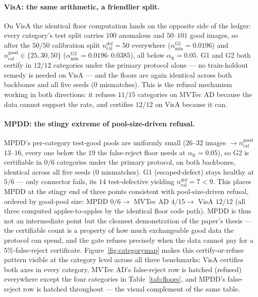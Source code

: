 \documentclass[preprint,11pt]{elsarticle}
\begin{document}
\paragraph{VisA: the same arithmetic, a friendlier split.} On VisA the identical floor
computation lands on the opposite side of the ledger: every category's test split carries
$100$ anomalous and $50$--$101$ good images, so after the $50/50$ calibration split
$n_{\text{cal}}^{\text{def}} = 50$ everywhere ($\alpha_{\min}^{\text{G1}} = 0.0196$) and
$n_{\text{cal}}^{\text{good}} \in \{25, 30, 50\}$ ($\alpha_{\min}^{\text{G2}} =
0.0196$--$0.0385$), all below $\alpha_{\text{fr}} = 0.05$. G1 and G2 both certify in
$12/12$ categories under the primary protocol alone --- no train-holdout remedy is needed on
VisA --- and the floors are again identical across both backbones and all five seeds ($0$
mismatches). This is the refusal mechanism working in both directions: it refuses $11/15$
categories on MVTec AD because the data cannot support the rate, and certifies $12/12$ on VisA
because it can.

\paragraph{MPDD: the stingy extreme of pool-size-driven refusal.} MPDD's per-category
test-good pools are uniformly small ($26$--$32$ images $\to n_{\text{cal}}^{\text{good}}$
$13$--$16$, every one below the $19$ the false-reject floor needs at $\alpha_{\text{fr}}=0.05$),
so G2 is certifiable in $0/6$ categories under the primary protocol, on both backbones,
identical across all five seeds ($0$ mismatches). G1 (escaped-defect) stays healthy at $5/6$ ---
only connector fails, its $14$ test-defective yielding $n_{\text{cal}}^{\text{def}}=7<9$.
This places MPDD at the stingy end of three points consistent with pool-size-driven refusal, ordered by good-pool size:
MPDD $0/6 \to$ MVTec AD $4/15 \to$ VisA $12/12$ (all three computed apples-to-apples by
the identical floor code path). MPDD is thus not an intermediate point but the cleanest
demonstration of the paper's thesis --- the certifiable count is a property of how much
exchangeable good data the protocol can spend, and the gate refuses precisely when the data
cannot pay for a $5\%$-false-reject certificate.
Figure~\ref{fig:categorymap} makes this certify-or-refuse pattern visible at the category level
across all three benchmarks: VisA certifies both axes in every category, MVTec AD's false-reject
row is hatched (refused) everywhere except the four categories in Table~\ref{tab:floors}, and
MPDD's false-reject row is hatched throughout --- the visual complement of the same table.
\end{document}
